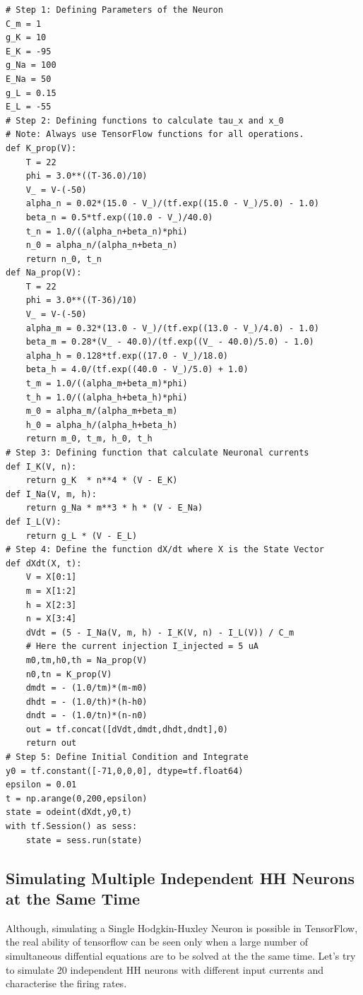 \documentclass[10pt,letterpaper]{article}
\begin{document}
\begin{verbatim}
# Step 1: Defining Parameters of the Neuron 
C_m = 1
g_K = 10
E_K = -95
g_Na = 100
E_Na = 50 
g_L = 0.15
E_L = -55
# Step 2: Defining functions to calculate tau_x and x_0
# Note: Always use TensorFlow functions for all operations.
def K_prop(V):
    T = 22
    phi = 3.0**((T-36.0)/10)
    V_ = V-(-50)
    alpha_n = 0.02*(15.0 - V_)/(tf.exp((15.0 - V_)/5.0) - 1.0)
    beta_n = 0.5*tf.exp((10.0 - V_)/40.0) 
    t_n = 1.0/((alpha_n+beta_n)*phi)
    n_0 = alpha_n/(alpha_n+beta_n)
    return n_0, t_n
def Na_prop(V):
    T = 22
    phi = 3.0**((T-36)/10)
    V_ = V-(-50)
    alpha_m = 0.32*(13.0 - V_)/(tf.exp((13.0 - V_)/4.0) - 1.0)
    beta_m = 0.28*(V_ - 40.0)/(tf.exp((V_ - 40.0)/5.0) - 1.0)
    alpha_h = 0.128*tf.exp((17.0 - V_)/18.0)
    beta_h = 4.0/(tf.exp((40.0 - V_)/5.0) + 1.0)
    t_m = 1.0/((alpha_m+beta_m)*phi)
    t_h = 1.0/((alpha_h+beta_h)*phi)
    m_0 = alpha_m/(alpha_m+beta_m)
    h_0 = alpha_h/(alpha_h+beta_h)
    return m_0, t_m, h_0, t_h
# Step 3: Defining function that calculate Neuronal currents
def I_K(V, n):
    return g_K  * n**4 * (V - E_K)
def I_Na(V, m, h):
    return g_Na * m**3 * h * (V - E_Na)
def I_L(V):
    return g_L * (V - E_L)
# Step 4: Define the function dX/dt where X is the State Vector
def dXdt(X, t):
    V = X[0:1]
    m = X[1:2]
    h = X[2:3]
    n = X[3:4]
    dVdt = (5 - I_Na(V, m, h) - I_K(V, n) - I_L(V)) / C_m 
    # Here the current injection I_injected = 5 uA
    m0,tm,h0,th = Na_prop(V)
    n0,tn = K_prop(V)
    dmdt = - (1.0/tm)*(m-m0)
    dhdt = - (1.0/th)*(h-h0)
    dndt = - (1.0/tn)*(n-n0)
    out = tf.concat([dVdt,dmdt,dhdt,dndt],0)
    return out
# Step 5: Define Initial Condition and Integrate
y0 = tf.constant([-71,0,0,0], dtype=tf.float64)
epsilon = 0.01
t = np.arange(0,200,epsilon)
state = odeint(dXdt,y0,t)
with tf.Session() as sess:
    state = sess.run(state)
\end{verbatim}

\subsection*{Simulating Multiple Independent HH Neurons at the Same Time}

Although, simulating a Single Hodgkin-Huxley Neuron is possible in TensorFlow, the real ability of tensorflow can be seen only when a large number of simultaneous diffential equations are to be solved at the the same time. Let's try to simulate 20 independent HH neurons with different input currents and characterise the firing rates. 
\end{document}

